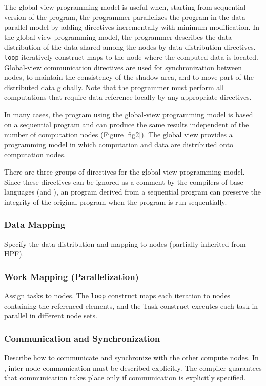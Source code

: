 The global-view
programming model is useful when, starting from sequential version of
the program, the programmer parallelizes the program in the data-parallel model by
adding directives incrementally with minimum modification. In the
global-view programming model, the programmer describes the data
distribution of the data shared among the nodes by data distribution
directives. {\tt loop} iteratively construct maps to the node where the 
computed data is located. Global-view communication directives are
used for synchronization between nodes, to maintain the consistency of the shadow
area, and to move part of the distributed data globally. Note 
that the programmer must perform all computations
that require data reference locally by any appropriate directives. 

In many cases, the
\XMP program using the global-view programming model is based on a sequential
program and can produce the same results independent of the
number of computation nodes (Figure \ref{fig2}). The
global view provides a 
programming model in which computation and data are distributed onto
computation nodes.

There are three groups of directives for the
global-view programming model. Since these directives can be ignored as a
comment by the compilers of base languages (\C and \Fort), an
\XMP program derived from a sequential program can preserve the
integrity of the original program when the program is run sequentially. 

\subsubsection*{Data Mapping}
Specify the data distribution and mapping to nodes (partially
inherited from HPF).

\subsubsection*{Work Mapping (Parallelization)}
Assign tasks to nodes. The {\tt loop} construct maps each iteration to
nodes containing the referenced elements, and the Task construct
executes each task in parallel in different node sets.

\subsubsection*{Communication and Synchronization}
Describe how to communicate and synchronize with the other compute
nodes. In \XMP, inter-node communication must be described
explicitly. The compiler guarantees that communication takes place
only if communication is explicitly specified.

